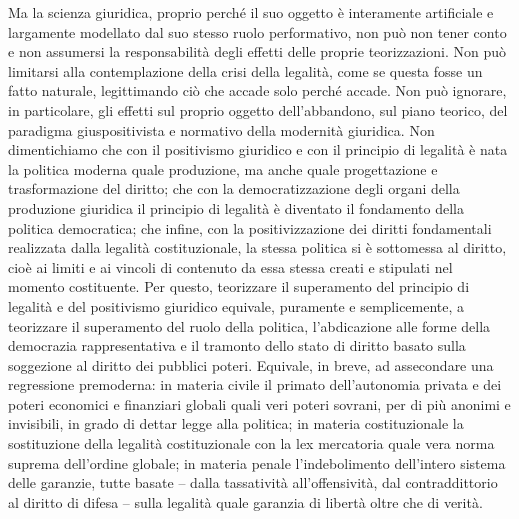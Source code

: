 Ma la scienza giuridica, proprio perché il suo oggetto è interamente artificiale e largamente modellato dal suo stesso ruolo performativo, non può non tener conto e non assumersi la responsabilità degli effetti delle proprie teorizzazioni. Non può limitarsi alla contemplazione della crisi della legalità, come se questa fosse un fatto naturale, legittimando ciò che accade solo perché accade. Non può ignorare, in particolare, gli effetti sul proprio oggetto dell’abbandono, sul piano teorico, del paradigma giuspositivista e normativo della modernità giuridica. Non dimentichiamo che con il positivismo giuridico e con il principio di legalità è nata la politica moderna quale produzione, ma anche quale progettazione e trasformazione del diritto; che con la democratizzazione degli organi della produzione giuridica il principio di legalità è diventato il fondamento della politica democratica; che infine, con la positivizzazione dei diritti fondamentali realizzata dalla legalità costituzionale, la stessa politica si è sottomessa al diritto, cioè ai limiti e ai vincoli di contenuto da essa stessa creati e stipulati nel momento costituente. Per questo, teorizzare il superamento del principio di legalità e del positivismo giuridico equivale, puramente e semplicemente, a teorizzare il superamento del ruolo della politica, l’abdicazione alle forme della democrazia rappresentativa e il tramonto dello stato di diritto basato sulla soggezione al diritto dei pubblici poteri. Equivale, in breve, ad assecondare una regressione premoderna: in materia civile il primato dell’autonomia privata e dei poteri economici e finanziari globali quali veri poteri sovrani, per di più anonimi e invisibili, in grado di dettar legge alla politica; in materia costituzionale la sostituzione della legalità costituzionale con la lex mercatoria quale vera norma suprema dell’ordine globale; in materia penale l’indebolimento dell’intero sistema delle garanzie, tutte basate – dalla tassatività all’offensività, dal contraddittorio al diritto di difesa – sulla legalità quale garanzia di libertà oltre che di verità.
